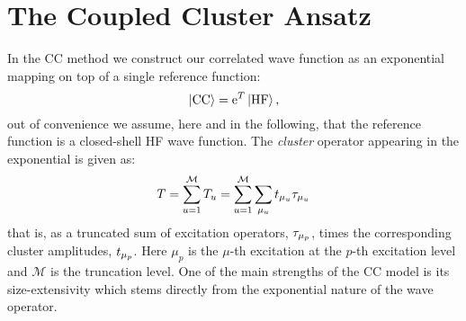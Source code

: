 \section{The Coupled Cluster Ansatz}\label{sec:coupled-cluster}

In the \acrlong*{CC} method we construct our correlated wave function as
an exponential mapping on top of a single reference
function:\autocite{Crawford2000-ey, Helgaker2000-tz, Bartlett2007-mz,
Shavitt2009-mr}
\begin{equation}
  \ket{\mathrm{CC}} = \mathrm{e}^{T}\ket{\mathrm{HF}},
\end{equation}
out of convenience we assume, here and in the following, that the
reference function is a closed-shell \acrshort{HF} wave function.
The \emph{cluster} operator appearing in the exponential is given as:
\begin{equation}
  T = \sum_{u=1}^\mathcal{M} T_u = \sum_{u=1}^\mathcal{M}\sum_{\mu_u}t_{\mu_u}\tau_{\mu_u}
\end{equation}
that is, as a truncated sum of excitation operators, $\tau_{\mu_p}$,
times the corresponding cluster amplitudes, $t_{\mu_p}$.
Here $\mu_p$ is the $\mu$-th excitation at the $p$-th excitation level and
$\mathcal{M}$ is the truncation level.
One of the main strengths of the \acrshort{CC} model is its size-extensivity
which stems directly from the exponential nature of the wave
operator.\autocite{Shavitt2009-mr, Helgaker2000-tz}

